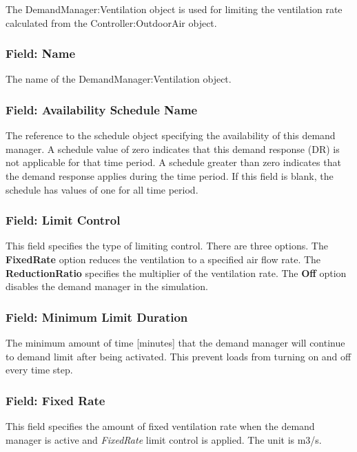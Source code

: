 The DemandManager:Ventilation object is used for limiting the ventilation rate calculated from the Controller:OutdoorAir object.

\subsubsection{Field: Name}\label{field-name-5-006}

The name of the DemandManager:Ventilation object.

\subsubsection{Field: Availability Schedule Name}\label{field-availability-schedule-name-4-000}

The reference to the schedule object specifying the availability of this demand manager. A schedule value of zero indicates that this demand response (DR) is not applicable for that time period. A schedule greater than zero indicates that the demand response applies during the time period. If this field is blank, the schedule has values of one for all time period.

\subsubsection{Field: Limit Control}\label{field-limit-control-3}

This field specifies the type of limiting control. There are three options. The \textbf{FixedRate} option reduces the ventilation to a specified air flow rate. The \textbf{ReductionRatio} specifies the multiplier of the ventilation rate. The \textbf{Off} option disables the demand manager in the simulation.

\subsubsection{Field: Minimum Limit Duration}\label{field-minimum-limit-duration-3}

The minimum amount of time {[}minutes{]} that the demand manager will continue to demand limit after being activated. This prevent loads from turning on and off every time step.

\subsubsection{Field: Fixed Rate}\label{field-fixed-rate}

This field specifies the amount of fixed ventilation rate when the demand manager is active and \emph{FixedRate} limit control is applied. The unit is m3/s.

